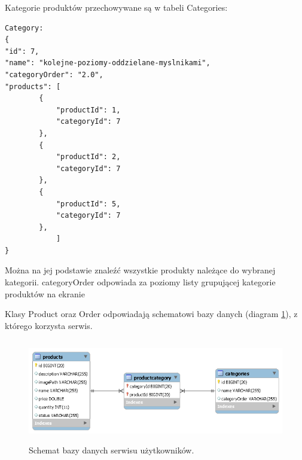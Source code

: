 \documentclass[11pt,a4paper,twoside]{article}
\begin{document}
Kategorie produktów przechowywane są w tabeli Categories:

\begin{lstlisting}
Category:
{
"id": 7,
"name": "kolejne-poziomy-oddzielane-myslnikami",
"categoryOrder": "2.0",
"products": [
		{
			"productId": 1,
            "categoryId": 7
		},
        {
			"productId": 2,
			"categoryId": 7
        },
        {
			"productId": 5,
			"categoryId": 7
        },
            ]
}
\end{lstlisting}
\vspace{-20pt}

Można na jej podstawie znaleźć wszystkie produkty należące do wybranej kategorii. categoryOrder odpowiada za poziomy listy grupującej kategorie produktów na ekranie

Klasy Product oraz Order odpowiadają schematowi bazy danych (diagram \ref{productDB}), z którego korzysta serwis.

\begin{figure}[ht]
\caption{Schemat bazy danych serwisu użytkowników.}
\label{productDB}
\centering
\includegraphics[height=4.5cm, width=15.7cm]{productDB}
\end{figure}
\end{document}
